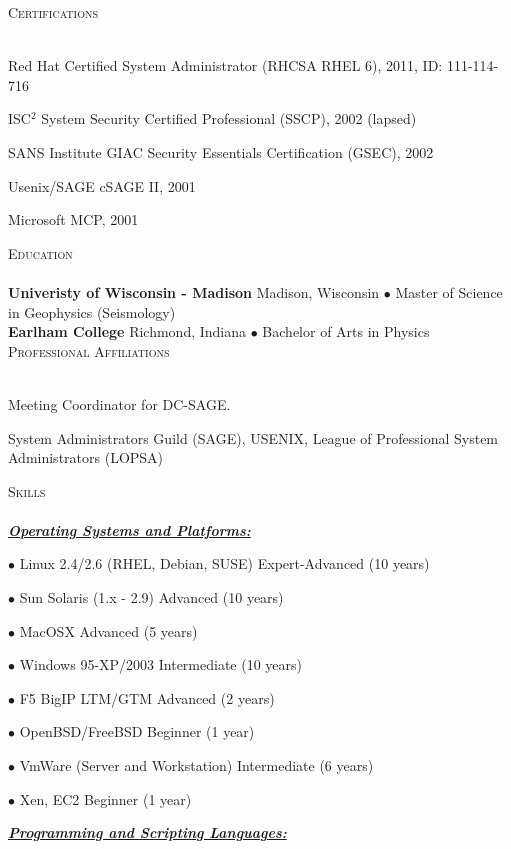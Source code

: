 \documentclass{article}
\newcommand{\lineunder}{\vspace*{-8pt} \\ \hspace*{-18pt} \hrulefill \\}
\newcommand{\header}[1]{{\hspace*{-15pt}\vspace*{6pt} \textsc{#1}} \vspace*{-6pt} \lineunder}
\newcommand{\skillset}[1]{{ \underline{\textbf{\emph{#1}}}\\  }}
\newcommand{\skill}[2]{{$\bullet$ #1 \hfill #2 }}
\newenvironment{achievements}{\begin{list}{\topsep 0pt \itemsep -2pt}} {\vspace*{4pt}\end{list}}
\newcommand{\school}[3]{
 \textbf{#1} #2 $\bullet$ #3\\ 
}
\begin{document}
\header{Certifications}
\begin{achievements}
\item Red Hat Certified System Administrator (RHCSA RHEL 6), 2011, ID: 111-114-716
\item ISC$^{2}$ System Security Certified Professional (SSCP), 2002 (lapsed)
\item SANS Institute GIAC Security Essentials Certification (GSEC), 2002
\item Usenix/SAGE cSAGE II, 2001
\item Microsoft MCP, 2001
\end{achievements}

\header{Education}

\school{Univeristy of Wisconsin - Madison}{Madison, Wisconsin} {Master of Science in Geophysics (Seismology)}
\school{Earlham College}{Richmond, Indiana}{Bachelor of Arts in Physics}

\header{Professional Affiliations}
\begin{achievements}
\item Meeting Coordinator for DC-SAGE.  
\item System Administrators Guild (SAGE), USENIX, League of Professional System Administrators (LOPSA) 
\end{achievements}


\header{Skills}

\skillset{Operating Systems and Platforms: }

\skill{Linux 2.4/2.6 (RHEL, Debian, SUSE)}{Expert-Advanced (10 years)}

\skill{Sun Solaris (1.x - 2.9)}{Advanced (10 years)}

\skill{MacOSX}{Advanced (5 years)}

\skill{Windows 95-XP/2003}{Intermediate (10 years)}

\skill{F5 BigIP LTM/GTM}{Advanced (2 years)}

\skill{OpenBSD/FreeBSD}{Beginner (1 year)}

\skill{VmWare (Server and Workstation)}{Intermediate (6 years)}

\skill{Xen, EC2}{Beginner (1 year)}



\skillset{Programming and Scripting Languages: }
\end{document}
